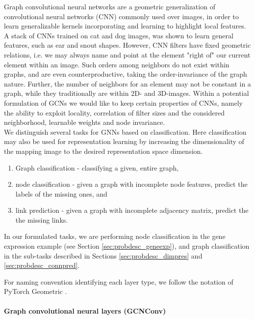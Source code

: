 \documentclass[]{article}
\renewcommand{\cite}{\citep}
\begin{document}
Graph convolutional neural networks are a geometric generalization of convolutional neural networks (CNN) commonly used over images, in order to learn generalizable kernels incorporating and learning to highlight local features. A stack of CNNs trained on cat and dog images, was shown to learn general features, such as ear and snout shapes. 
However, CNN filters have fixed geometric relations, i.e. we may always name and point at the element "right of" our current element within an image. Such orders among neighbors do not exist within graphs, and are even counterproductive, taking the order-invariance of the graph nature. Further, the number of neighbors for an element may not be constant in a graph, while they traditionally are within 2D- and 3D-images. Within a potential formulation of GCNs we would like to keep certain properties of CNNs, namely the ability to exploit locality, correlation of filter sizes and the considered neighborhood, learnable weights and node invariance. \\

We distinguish several tasks for GNNs based on classification. Here classification may also be used for representation learning by increasing the dimensionality of the mapping image to the desired representation space dimension. 
\begin{enumerate}
	\item Graph classification - classifying a given, entire graph,
	\item node classification -  given a graph with incomplete node features, predict the labels of the missing ones, and
	\item link prediction - given a graph with incomplete adjacency matrix, predict the the missing links.
\end{enumerate}
In our formulated tasks, we are performing node classification in the gene expression example (see Section \ref{sec:probdesc_geneexp}), and graph classification in the sub-tasks described in Sections \ref{sec:probdesc_dimpres} and \ref{sec:probdesc_connpred}.

For naming convention identifying each layer type, we follow the notation of PyTorch Geometric \cite{PytorchGeometric}.

\paragraph{Graph convolutional neural layers (GCNConv)}\mbox{}\\
\label{sec:GCNConv}
\end{document}
